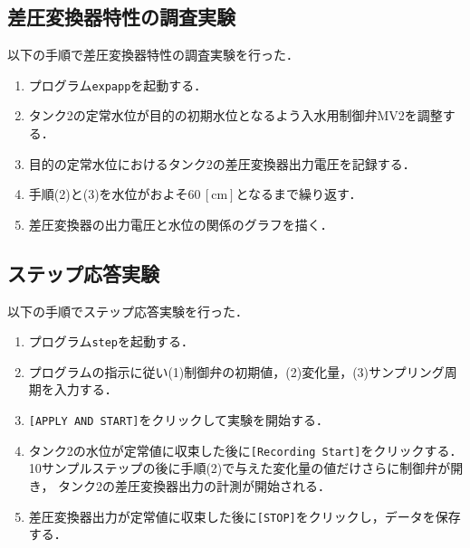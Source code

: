 \documentclass[11pt,a4paper]{jsarticle}
\begin{document}


\subsection{差圧変換器特性の調査実験}

以下の手順で差圧変換器特性の調査実験を行った．
\begin{enumerate}
  \item プログラム\texttt{expapp}を起動する．
  \item タンク2の定常水位が目的の初期水位となるよう入水用制御弁MV2を調整する．
  \item 目的の定常水位におけるタンク2の差圧変換器出力電圧を記録する．
  \item 手順(2)と(3)を水位がおよそ$60 \, \mathrm{[cm]}$となるまで繰り返す．
  \item 差圧変換器の出力電圧と水位の関係のグラフを描く．
\end{enumerate}

\subsection{ステップ応答実験}

以下の手順でステップ応答実験を行った．
\begin{enumerate}
  \item プログラム\texttt{step}を起動する．
  \item プログラムの指示に従い(1)制御弁の初期値，(2)変化量，(3)サンプリング周期を入力する．
  \item \texttt{[APPLY AND START]}をクリックして実験を開始する．
  \item タンク2の水位が定常値に収束した後に\texttt{[Recording Start]}をクリックする．
        10サンプルステップの後に手順(2)で与えた変化量の値だけさらに制御弁が開き，
        タンク2の差圧変換器出力の計測が開始される．
  \item 差圧変換器出力が定常値に収束した後に\texttt{[STOP]}をクリックし，データを保存する．
\end{enumerate}
\end{document}
